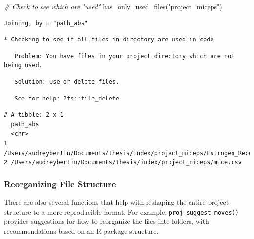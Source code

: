 \documentclass[12pt,twoside]{reedthesis}
\newenvironment{Shaded}{\begin{snugshade}}{\end{snugshade}}
\newcommand{\CommentTok}[1]{\textcolor[rgb]{0.56,0.35,0.01}{\textit{#1}}}
\newcommand{\FunctionTok}[1]{\textcolor[rgb]{0.00,0.00,0.00}{#1}}
\newcommand{\NormalTok}[1]{#1}
\newcommand{\StringTok}[1]{\textcolor[rgb]{0.31,0.60,0.02}{#1}}
\begin{document}
\begin{Shaded}
\begin{Highlighting}[]
\CommentTok{\# Check to see which are "used"}
\FunctionTok{has\_only\_used\_files}\NormalTok{(}\StringTok{"project\_miceps"}\NormalTok{)}
\end{Highlighting}
\end{Shaded}
\begin{verbatim}
Joining, by = "path_abs"
\end{verbatim}
\begin{verbatim}
* Checking to see if all files in directory are used in code
\end{verbatim}
\begin{verbatim}
   Problem: You have files in your project directory which are not being used.
\end{verbatim}
\begin{verbatim}
   Solution: Use or delete files.
\end{verbatim}
\begin{verbatim}
   See for help: ?fs::file_delete
\end{verbatim}
\begin{verbatim}
# A tibble: 2 x 1
  path_abs                                                                      
  <chr>                                                                         
1 /Users/audreybertin/Documents/thesis/index/project_miceps/Estrogen_Receptors.~
2 /Users/audreybertin/Documents/thesis/index/project_miceps/mice.csv            
\end{verbatim}
\hypertarget{reorganizing-file-structure}{%
\subsubsection{Reorganizing File Structure}\label{reorganizing-file-structure}}

There are also several functions that help with reshaping the entire project structure to a more reproducible format. For example, \texttt{proj\_suggest\_moves()} provides suggestions for how to reorganize the files into folders, with recommendations based on an R package structure.
\end{document}
